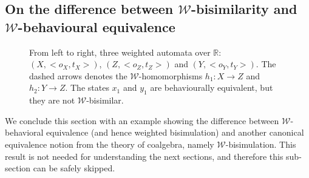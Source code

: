 \documentclass[3p]{elsarticle}
\newcommand{\fW}{\mathcal{W}}    %
\begin{document}
\subsection{On the difference between $\fW$-bisimilarity and $\fW$-behavioural equivalence}\label{sec:difference}

\begin{figure}[t]{%
\MediumPicture
%
\begin{center}
\end{center}
\vspace*{.2cm} \caption{From left to right, three weighted automata
over $\mathbb{R}$: $(X,<o_X,t_X>)$, $(Z,<o_Z,t_Z>)$ and
$(Y,<o_Y,t_Y>)$. The dashed arrows denotes the $\fW$-homomorphisms
$h_1\colon  X \to Z$ and $h_2\colon  Y \to Z$. The states $x_1$ and
$y_1$ are behaviourally equivalent, but they are not
$\fW$-bisimilar.}\label{fig:cexample}}
\end{figure}


We conclude this section with an example showing the difference
between $\fW$-behavioral equivalence (and hence weighted bisimulation)
and another canonical equivalence notion from the theory of coalgebra,
namely $\fW$-bisimulation. This result is not needed for understanding
the next sections, and  therefore this sub-section can be safely skipped.
%
\end{document}
